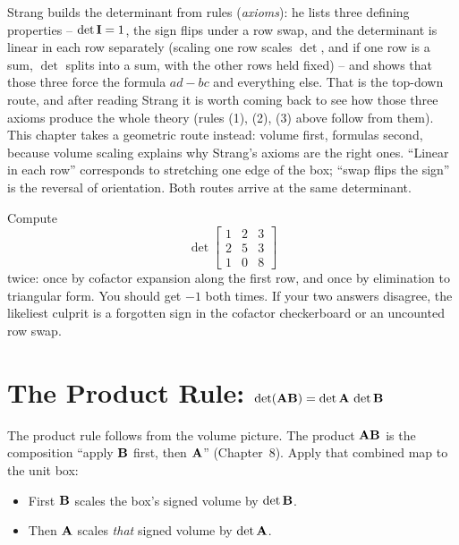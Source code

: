\begin{strangbox}
Strang builds the determinant from rules (\emph{axioms}): he lists three defining properties --
$\det\mathbf{I} = 1$, the sign flips under a row swap, and the determinant is linear in
each row separately (scaling one row scales $\det$, and if one row is a sum, $\det$
splits into a sum, with the other rows held fixed) -- and shows that those three force the formula $ad-bc$ and
everything else. That is the top-down route, and after reading Strang it is worth
coming back to see how those three axioms produce the whole theory
(rules (1), (2), (3) above follow from them). This chapter takes a geometric
route instead: volume first, formulas second, because volume scaling explains
why Strang's axioms are the right ones. ``Linear in each row'' corresponds to
stretching one edge of the box; ``swap flips the sign'' is the reversal of
orientation. Both routes arrive at the same determinant.
\end{strangbox}

\begin{labbox}
Compute
\[
  \det\begin{bmatrix} 1 & 2 & 3 \\ 2 & 5 & 3 \\ 1 & 0 & 8 \end{bmatrix}
\]
twice: once by cofactor expansion along the first row, and once by elimination to
triangular form. You should get $-1$ both times. If your two answers disagree, the
likeliest culprit is a forgotten sign in the cofactor checkerboard or an
uncounted row swap.
\end{labbox}

\section{The Product Rule: \texorpdfstring{$\det(\mathbf{A}\mathbf{B}) = \det\mathbf{A}\,\det\mathbf{B}$}{det(AB)=detA detB}}
\label{ch21:product}

The product rule follows from the volume picture.
The product $\mathbf{A}\mathbf{B}$ is the composition ``apply $\mathbf{B}$
first, then $\mathbf{A}$'' (Chapter~8). Apply that combined map to the unit box:

\begin{itemize}
  \item First $\mathbf{B}$ scales the box's signed volume by $\det\mathbf{B}$.
  \item Then $\mathbf{A}$ scales \emph{that} signed volume by $\det\mathbf{A}$.
\end{itemize}

